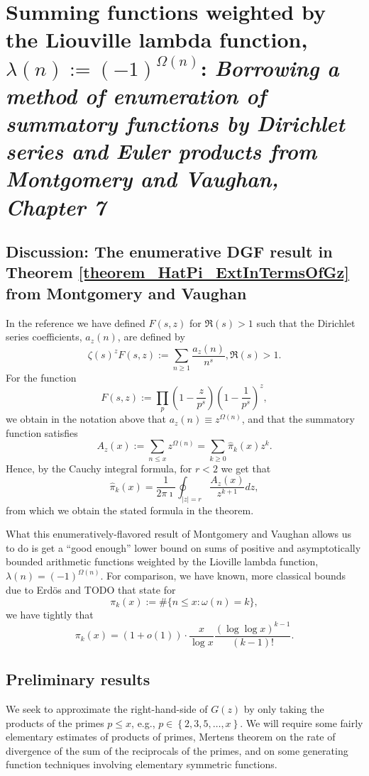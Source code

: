 \documentclass[11pt,reqno,a4letter]{article}
\numberwithin{figure}{section}
\numberwithin{table}{section}
\theoremstyle{plain}
\numberwithin{theorem}{section}
\theoremstyle{definition}
\begin{document}
\newpage 
\section{Summing functions weighted by the Liouville lambda function, $\lambda(n) := (-1)^{\Omega(n)}$: 
         \textit{
         Borrowing a method of enumeration of summatory functions by Dirichlet series and Euler products 
         from Montgomery and Vaughan, Chapter 7} 
        } 
        
\subsection{Discussion: The enumerative DGF result in Theorem \ref{theorem_HatPi_ExtInTermsOfGz} from 
            Montgomery and Vaughan} 

In the reference we have defined $F(s, z)$ for $\Re(s) > 1$ such that the 
Dirichlet series coefficients, $a_z(n)$, are defined by 
\[
\zeta(s)^z F(s, z) := \sum_{n \geq 1} \frac{a_z(n)}{n^s}, \Re(s) > 1. 
\]
For the function 
\[
F(s, z) := \prod_p \left(1 - \frac{z}{p^s}\right) \left(1-\frac{1}{p^s}\right)^z, 
\]
we obtain in the notation above that $a_z(n) \equiv z^{\Omega(n)}$, and that the summatory 
function satisfies 
\[
A_z(x) := \sum_{n \leq x} z^{\Omega(n)} = \sum_{k \geq 0} \widehat{\pi}_k(x) z^k. 
\]
Hence, by the Cauchy integral formula, for $r < 2$ we get that 
\[
\widehat{\pi}_k(x) = \frac{1}{2\pi\imath} \oint_{|z|=r} \frac{A_z(x)}{z^{k+1}} dz, 
\]
from which we obtain the stated formula in the theorem. 

What this enumeratively-flavored result of Montgomery and Vaughan allows us to do is get a 
``good enough'' lower bound on sums of positive and asymptotically bounded arithmetic functions 
weighted by the Lioville lambda function, $\lambda(n) = (-1)^{\Omega(n)}$. 
For comparison, we have known, more classical bounds due to Erd\"os and TODO that state for 
\[
\pi_k(x) := \#\{n \leq x: \omega(n) = k\}, 
\]
we have tightly that \cite{TODO,TODO} 
\[
\pi_k(x) = (1 + o(1)) \cdot \frac{x}{\log x} \frac{(\log\log x)^{k-1}}{(k-1)!}. 
\] 

\subsection{Preliminary results} 

We seek to approximate the right-hand-side of $G(z)$ by only taking the products of the primes 
$p \leq x$, e.g., $p \in \left\{2,3,5,\ldots,x\right\}$. 
We will require some fairly elementary estimates of products of primes, Mertens theorem on the 
rate of divergence of the sum of the reciprocals of the primes, and on some generating function 
techniques involving elementary symmetric functions. 
\end{document}

